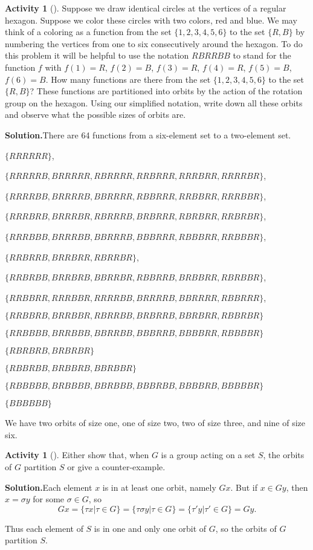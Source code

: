 \documentclass[10pt,]{book}
\theoremstyle{plain}
\theoremstyle{definition}
\newtheorem{activity}[project]{Activity}
\numberwithin{equation}{chapter}
\begin{document}
\begin{activity}[]\label{coloredhex}
Suppose we draw identical circles at the vertices of a regular hexagon. Suppose we color these circles with two colors, red and blue. We may think of a coloring as a function from the set \(\{1,2,3,4,5,6\}\) to the set \(\{R,B\}\) by numbering the vertices from one to six consecutively around the hexagon. To do this problem it will be helpful to use the notation \(RBRRBB\) to stand for the function \(f\) with \(f(1) =R\), \(f(2)=B\), \(f(3)=R\), \(f(4) = R\), \(f(5)=B\), \(f(6)=B\). How many functions are there from the set \(\{1,2,3,4,5,6\}\) to the set \(\{R,B\}\)? These functions are partitioned into orbits by the action of the rotation group on the hexagon. Using our simplified notation, write down all these orbits and observe what the possible sizes of orbits are.%
\par\medskip\noindent%
\textbf{Solution.}\quad There are 64 functions from a six-element set to a two-element set.%
\par
\(\{RRRRRR\}\),%
\par
\(\{RRRRRB, BRRRRR, RBRRRR, RRBRRR,
RRRBRR, RRRRBR\}\),%
\par
\(\{RRRRBB, BRRRRB, BBRRRR, RBBRRR, RRBBRR, RRRBBR\}\),%
\par
\(\{RRRBRB, BRRRBR, RBRRRB, BRBRRR, RBRBRR, RRBRBR\}\),%
\par
\(\{RRRBBB, BRRRBB, BBRRRB, BBBRRR, RBBBRR, RRBBBR\}\),%
\par
\(\{RRBRRB, BRRBRR, RBRRBR\}\),%
\par
\(\{RRBRBB, BRRBRB, BBRRBR, RBBRRB, BRBBRR, RBRBBR\}\),%
\par
\(\{RRBBRR, RRRBBR, RRRRBB, BRRRRB, BBRRRR, RBBRRR\}\),%
\par
\(\{RRBBRB, BRRBBR, RBRRBB, BRBRRB, BBRBRR, RBBRBR\}\)%
\par
\(\{RRBBBB, BRRBBB, BBRRBB, BBBRRB, BBBBRR, RBBBBR\}\)%
\par
\(\{RBRBRB,
BRBRBR\}\)%
\par
\(\{RBBRBB, BRBBRB, BBRBBR \}\)%
\par
\(\{RBBBBB, BRBBBB, BBRBBB, BBBRBB,BBBBRB, BBBBBR\}\)%
\par
\(\{BBBBBB\}\)%
\par
We have two orbits of size one, one of size two, two of size three, and nine of size six.%
\end{activity}
\begin{activity}[]\label{activity-278}
Either show that, when \(G\) is a group acting on a set \(S\), the orbits of \(G\) partition \(S\) or give a counter-example.%
\par\medskip\noindent%
\textbf{Solution.}\quad Each element \(x\) is in at least one orbit, namely \(Gx\). But if \(x\in Gy\), then \(x=\sigma y\) for some \(\sigma \in G\), so%
\begin{equation*}
Gx=\{\tau x|\tau
\in G\} =
\{\tau\sigma y|\tau\in G\}= \{\tau' y|\tau' \in G\} = Gy.
\end{equation*}
%
\par
Thus each element of \(S\) is in one and only one orbit of \(G\), so the orbits of \(G\) partition \(S\).%
\end{activity}
\end{document}
